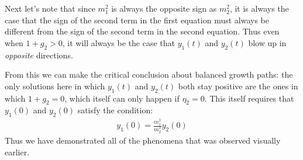 \documentclass{article}
\theoremstyle{theorem}
\begin{document}
Next let's note that since $m^2_1$ is always the opposite sign as $m^2_2$, it is always the case that the sign of the second term in the first equation must always be different from the sign of the second term in the second equation. Thus even when $1+g_2 > 0$, it will always be the case that $y_1(t)$ and $y_2(t)$ blow up in \emph{opposite} directions. \par 
From this we can make the critical conclusion about balanced growth paths: the only solutions here in which $y_1(t)$ and $y_2(t)$ both stay positive are the ones in which $1+g_2 = 0$, which itself can only happen if $\eta_2 = 0$. This itself requires that $y_1(0)$ and $y_2(0)$ satisfy the condition:
\begin{align}
	y_1(0) = \frac{m^1_1}{m^1_2}y_2(0)
\end{align}
Thus we have demonstrated all of the phenomena that was observed visually earlier. 
\end{document}

